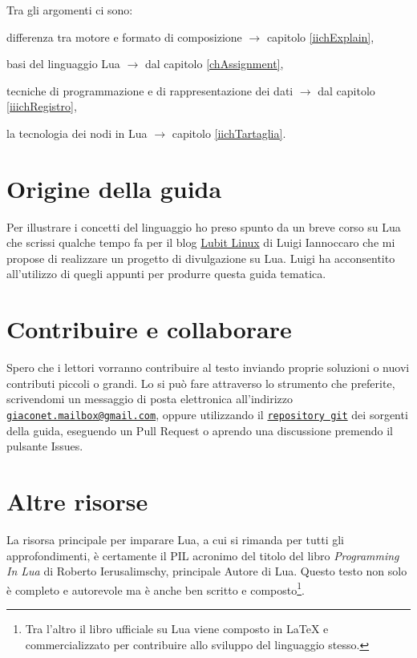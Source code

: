 Tra gli argomenti ci sono:
\begin{compactitemize}
\item differenza tra motore e formato di composizione \( \to \) capitolo
\ref{iichExplain},
\item basi del linguaggio Lua \( \to \) dal capitolo \ref{chAssignment},
\item tecniche di programmazione e di rappresentazione dei dati \( \to \) dal
capitolo \ref{iiichRegistro},
\item la tecnologia dei nodi in Lua \( \to \) capitolo \ref{iichTartaglia}.
\end{compactitemize}


\section{Origine della guida}

Per illustrare i concetti del linguaggio ho preso spunto da un breve corso su
Lua che scrissi qualche tempo fa per il blog
\href{http://parliamodi-ubuntu.blogspot.it}{Lubit Linux} di Luigi Iannoccaro
che mi propose di realizzare un progetto di divulgazione su Lua. Luigi ha
acconsentito all'utilizzo di quegli appunti per produrre questa guida tematica.


\section{Contribuire e collaborare}

Spero che i lettori vorranno contribuire al testo inviando proprie soluzioni o
nuovi contributi piccoli o grandi. Lo si può fare attraverso lo strumento che
preferite, scrivendomi un messaggio di posta elettronica all'indirizzo
\href{mailto:giaconet.mailbox@gmail.com}{\texttt{giaconet.mailbox@gmail.com}},
oppure utilizzando il
\href{https://github.com/GuITeX/guidalua}{\texttt{repository git}} dei sorgenti
della guida, eseguendo un Pull Request o aprendo una discussione premendo il
pulsante Issues.


\section{Altre risorse}

La risorsa principale per imparare Lua, a cui si rimanda per tutti gli
approfondimenti, è certamente il PIL \cite{PIL} acronimo del titolo del libro
\emph{Programming In Lua} di Roberto Ierusalimschy, principale Autore di Lua.
Questo testo non solo è completo e autorevole ma è anche ben scritto e
composto\footnote{Tra l'altro il libro ufficiale su Lua viene composto in
\LaTeX{} e commercializzato per contribuire allo sviluppo del linguaggio
stesso.}.


